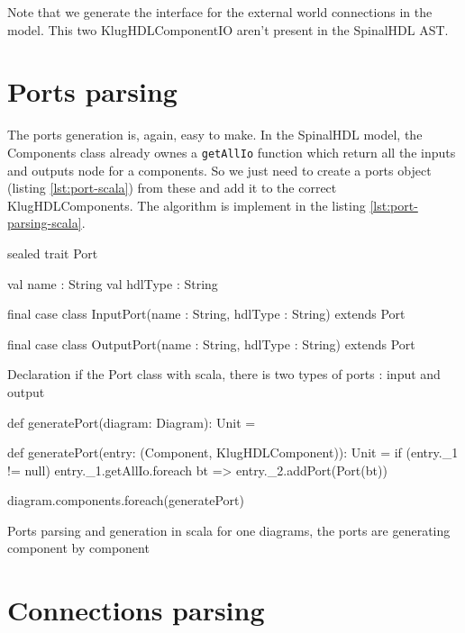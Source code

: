 Note that we generate the interface for the external world connections in the
model. This two KlugHDLComponentIO aren't present in the SpinalHDL AST.

\section{Ports parsing}
\label{sec:ports-parsing}

The ports generation is, again, easy to make. In the SpinalHDL model, the
Components class already ownes a \verb|getAllIo| function which return all the
inputs and outputs node for a components. So we just need to create a ports
object (listing \ref{lst:port-scala}) from these and add it to the correct
KlugHDLComponents. The algorithm is implement in the listing
\ref{lst:port-parsing-scala}.

\begin{listing}[H]
  \centering
  \begin{scalacode}
  sealed trait Port {

    val name : String
    val hdlType : String
  }

  final case class InputPort(name : String, hdlType : String) extends Port

  final case class OutputPort(name : String, hdlType : String) extends Port
  \end{scalacode}
  \caption[Diagram class declaration]{Declaration if the Port class with scala,
    there is two types of ports : input and output}
  \label{lst:port-scala}
\end{listing}

\begin{listing}[H]
  \centering
  \begin{scalacode}
  def generatePort(diagram: Diagram): Unit = {
    def generatePort(entry: (Component, KlugHDLComponent)): Unit = {
      if (entry._1 != null) {
        entry._1.getAllIo.foreach { bt =>
          entry._2.addPort(Port(bt))
        }
      }
    }

    diagram.components.foreach(generatePort)
  }
  \end{scalacode}
  \caption[Implementation of the ports parsing]{Ports parsing and generation in
    scala for one diagrams, the ports are generating component by component}
  \label{lst:port-parsing-scala}
\end{listing}

\section{Connections parsing}
\label{sec:connections-parsing}

